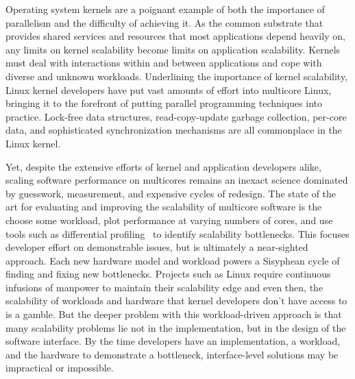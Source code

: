 Operating system kernels are a poignant example of both the importance
of parallelism and the difficulty of achieving it.
%
As the common substrate that provides shared services and resources
that most applications depend heavily on, any limits on kernel
scalability become limits on application scalability.
%
Kernels must deal with interactions within and between applications
and cope with diverse and unknown workloads.
%
%
Underlining the importance of kernel scalability, Linux kernel
developers have put vast amounts of effort into multicore Linux,
bringing it to the forefront of putting parallel programming
techniques into practice.  Lock-free data structures, read-copy-update
garbage collection, per-core data, and sophisticated synchronization
mechanisms are all commonplace in the Linux kernel.

Yet, despite the extensive efforts of kernel and application
developers alike, scaling software performance on multicores remains
an inexact science dominated by guesswork, measurement, and expensive
cycles of redesign.
%
The state of the art for evaluating and improving the scalability of
multicore software is the choose some workload, plot performance at
varying numbers of cores, and use tools such as differential
profiling~\cite{mckenney:differential} to identify scalability
bottlenecks.    
%
This focuses developer effort on demonstrable issues, but is
ultimately a near-sighted approach.
%
%
Each new hardware model and workload powers a Sisyphean cycle of
finding and fixing new bottlenecks.
%
Projects such as Linux require continuous infusions of manpower to
maintain their scalability edge and even then, the scalability of
workloads and hardware that kernel developers don't have access to is
a gamble.
%
But the deeper problem with this workload-driven approach is that many
scalability problems lie not in the implementation, but in the design
of the
software interface.  By the time developers have an implementation, a
workload, and the hardware to demonstrate a bottleneck,
interface-level solutions may be impractical or impossible.

